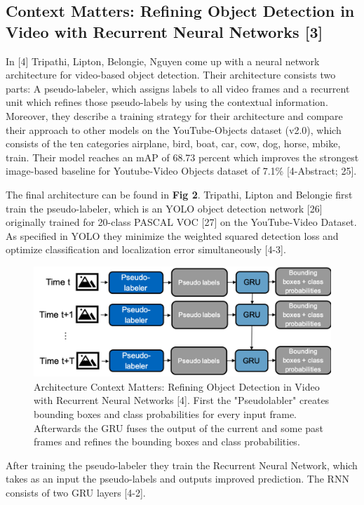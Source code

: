 \documentclass[conference]{IEEEtran}
\begin{document}
\subsection{Context Matters: Refining Object Detection in Video with Recurrent Neural Networks [3]}
In [4] Tripathi, Lipton, Belongie, Nguyen come up with a neural network architecture for video-based object detection. Their architecture consists two parts: A pseudo-labeler, which assigns labels to all video frames and a recurrent unit which refines those pseudo-labels by using the contextual information. Moreover, they describe a training strategy for their architecture and compare their approach to other models on the YouTube-Objects dataset (v2.0), which consists of the ten categories airplane, bird, boat, car, cow, dog, horse, mbike, train. Their model reaches an mAP of 68.73 percent which improves the strongest image-based baseline for Youtube-Video Objects dataset of 7.1\% [4-Abstract; 25]. \newline

The final architecture can be found in \textbf{Fig 2}. Tripathi, Lipton and Belongie first train the pseudo-labeler, which is an YOLO object detection network [26] originally trained for 20-class PASCAL VOC [27] on the YouTube-Video Dataset. As specified in YOLO  they minimize the weighted squared detection loss and optimize classification and localization error simultaneously [4-3]. 

\begin{figure} [h]
\includegraphics[width=\columnwidth]{ContextMatters}
\caption{Architecture Context Matters: Refining Object Detection in Video with Recurrent Neural Networks [4]. First the "Pseudolabler" creates bounding boxes and class probabilities for every input frame. Afterwards the GRU fuses the output of the current and some past frames and refines the bounding boxes and class probabilities.}
\end{figure}

After training the pseudo-labeler they train the Recurrent Neural Network, which takes as an input the pseudo-labels and outputs improved prediction. The RNN consists of two GRU layers [4-2]. \newline
\end{document}
